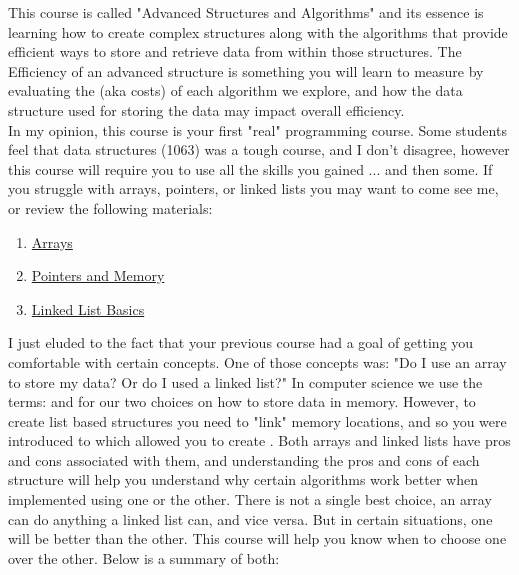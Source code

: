 \newpage
{}

 This course is called "Advanced Structures and Algorithms" and its essence is learning how to create complex structures along with the algorithms that provide efficient ways to store and retrieve data from within those structures. The Efficiency of an advanced structure is something you will learn to measure by evaluating the  (aka costs) of each algorithm we explore, and how the data structure used for storing the data may impact overall efficiency.\\
 
 In my opinion, this course is your first "real" programming course. Some students feel that data structures (1063) was a tough course, and I don't disagree, however this course will require you to use all the skills you gained ... and then some. If you struggle with arrays, pointers, or linked lists you may want to come see me, or review the following materials:
 
 \begin{enumerate}
    \item \href{https://cs.msutexas.edu/~griffin/materials/Arrays.pdf}{Arrays}
    \item \href{https://cs.msutexas.edu/~griffin/materials/PointersAndMemory.pdf}{Pointers and Memory}
    \item \href{https://cs.msutexas.edu/~griffin/materials/LinkedListBasics.pdf}{Linked List Basics}
\end{enumerate}


I just eluded to the fact that your previous course had a goal of getting you comfortable with certain concepts. One of those concepts was: "Do I use an array to store my data? Or do I used a linked list?"  In computer science we use the terms:  and  for our two choices on how to store data in memory. However, to create list based structures you need to "link" memory locations, and so you were introduced to  which allowed you to create . Both arrays and linked lists have pros and cons associated with them, and understanding the pros and cons of each structure will help you understand why certain algorithms work better when implemented using one or the other. There is not a single best choice, an array can do anything a linked list can, and vice versa. But in certain situations, one will be better than the other. This course will help you know when to choose one over the other. Below is a summary of both: \\

